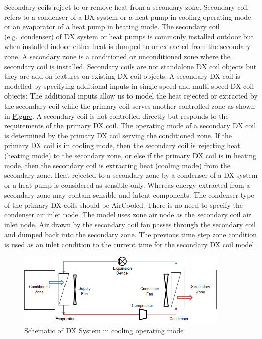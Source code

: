 Secondary coils reject to or remove heat from a secondary zone. Secondary coil refers to a condenser of a DX system or a heat pump in cooling operating mode or an evaporator of a heat pump in heating mode. The secondary coil (e.g.~condenser) of DX system or heat pumps is commonly installed outdoor but when installed indoor either heat is dumped to or extracted from the secondary zone. A secondary zone is a conditioned or unconditioned zone where the secondary coil is installed. Secondary coils are not standalone DX coil objects but they are add-on features on existing DX coil objects. A secondary DX coil is modelled by specifying additional inputs in single speed and multi speed DX coil objects: The additional inputs allow us to model the heat rejected or extracted by the secondary coil while the primary coil serves another controlled zone as shown in \protect\hyperlink{SchematicDXCoil}{Figure}. A secondary coil is not controlled directly but responds to the requirements of the primary DX coil. The operating mode of a secondary DX coil is determined by the primary DX coil serving the conditioned zone. If the primary DX coil is in cooling mode, then the secondary coil is rejecting heat (heating mode) to the secondary zone, or else if the primary DX coil is in heating mode, then the secondary coil is extracting heat (cooling mode) from the secondary zone. Heat rejected to a secondary zone by a condenser of a DX system or a heat pump is considered as sensible only. Whereas energy extracted from a secondary zone may contain sensible and latent components. The condenser type of the primary DX coils should be AirCooled. There is no need to specify the condenser air inlet node. The model uses zone air node as the secondary coil air inlet node. Air drawn by the secondary coil fan passes through the secondary coil and dumped back into the secondary zone. The previous time step zone condition is used as an inlet condition to the current time for the secondary DX coil model.

\begin{figure}[hbtp]
\centering
\includegraphics[width=0.9\textwidth, height=0.9\textheight, keepaspectratio=true]{media/image8002.png}
\caption{Schematic of DX System in cooling operating mode \protect \label{fig:schematic-of-dx-system-in-cooling-operating-mode}}
\end{figure}

